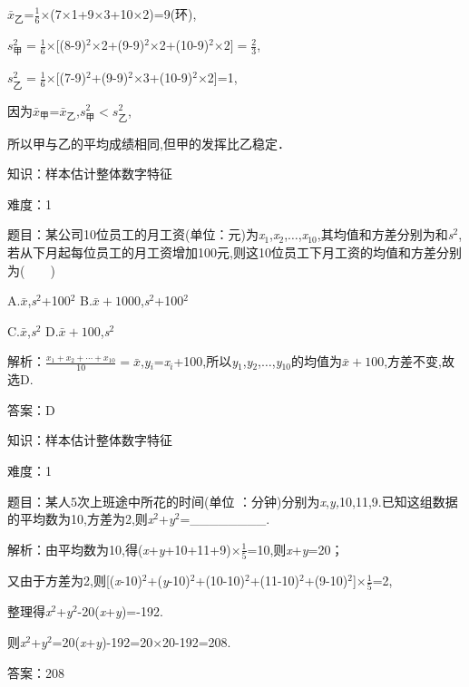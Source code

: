 \documentclass{article} %
\begin{document}
${\bar{x}}_{\textrm{乙}}$=$\frac{1}{6}\mathrm{\times}$(7$\mathrm{\times}$1+9$\mathrm{\times}$3+10$\mathrm{\times}$2)=9(环),

$s_{\text{甲}}^2=\frac{1}{6}\mathrm{\times}$[(8-9)${}^{2}$$\mathrm{\times}$2+(9-9)${}^{2}$$\mathrm{\times}$2+(10-9)${}^{2}$$\mathrm{\times}2]=\frac{2}{3}$,

$s_{\text{乙}}^2=\frac{1}{6}\mathrm{\times}$[(7-9)${}^{2}$+(9-9)${}^{2}$$\mathrm{\times}$3+(10-9)${}^{2}$$\mathrm{\times}$2]=1,

因为$\bar{x}_{\text{甲}}$=$\bar{x}_{\text{乙}}$,$s_{\text{甲}}^2\mathrm{<}s_{\text{乙}}^2$,

所以甲与乙的平均成绩相同,但甲的发挥比乙稳定．

知识：样本估计整体数字特征

难度：1

题目：某公司10位员工的月工资(单位：元)为\textit{x}${}_{1}$,\textit{x}${}_{2}$,$\dots$,\textit{x}${}_{10}$,其均值和方差分别为和\textit{s}${}^{2}$,若从下月起每位员工的月工资增加100元,则这10位员工下月工资的均值和方差分别为(　　)

A.$\bar{x}$,\textit{s}${}^{2}$+100${}^{2}$  B.$\bar{x}+100$0,\textit{s}${}^{2}$+100${}^{2}$

C.$\bar{x}$,\textit{s}${}^{2}$        D.$\bar{x}+100$,\textit{s}${}^{2}$

解析：$\frac{x_1+x_2+\cdots+x_{10}}{10}=\bar{x}$,\textit{y${}_{i}$}=\textit{x${}_{i}$}+100,所以\textit{y}${}_{1}$,\textit{y}${}_{2}$,$\dots$,\textit{y}${}_{10}$的均值为$\bar{x}+100$,方差不变,故选D.

答案：D

知识：样本估计整体数字特征

难度：1

题目：某人5次上班途中所花的时间(单位 ：分钟)分别为\textit{x},\textit{y,}10,11,9.已知这组数据的平均数为10,方差为2,则\textit{x}${}^{2}$+\textit{y}${}^{2}$=\_\_\_\_\_\_\_\_.

解析：由平均数为10,得(\textit{x}+\textit{y}+10+11+9)$\mathrm{\times}\frac{1}{5}$=10,则\textit{x}+\textit{y}=20；

又由于方差为2,则[(\textit{x}-10)${}^{2}$+(\textit{y}-10)${}^{2}$+(10-10)${}^{2}$+(11-10)${}^{2}$+(9-10)${}^{2}$]$\mathrm{\times}\frac{1}{5}$=2,

整理得\textit{x}${}^{2}$+\textit{y}${}^{2}$-20(\textit{x}+\textit{y})=-192.

则\textit{x}${}^{2}$+\textit{y}${}^{2}$=20(\textit{x}+\textit{y})-192=20$\mathrm{\times}$20-192=208.

答案：208
\end{document}
